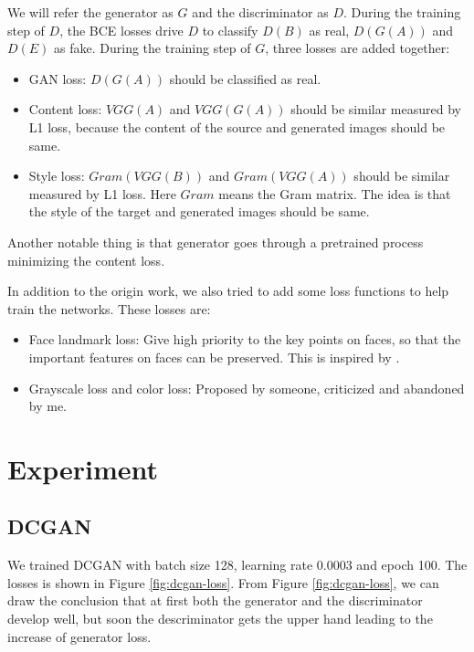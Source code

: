 \documentclass[10pt,twocolumn,letterpaper]{article}
\begin{document}
We will refer the generator as $G$ and the discriminator as $D$. During the
training step of $D$, the BCE losses drive $D$ to classify $D(B)$ as real,
$D(G(A))$ and $D(E)$ as fake. During the training step of $G$, three losses are
added together:
\begin{itemize}[noitemsep, topsep=0pt]
   \item GAN loss: $D(G(A))$ should be classified as real.
   \item Content loss: $VGG(A)$ and $VGG(G(A))$ should be similar measured by L1
   loss, because the content of the source and generated images should be same.
   \item Style loss: $Gram(VGG(B))$ and $Gram(VGG(A))$ should be similar
   measured by L1 loss. Here $Gram$ means the Gram matrix. The idea is that the
   style of the target and generated images should be same.
\end{itemize}
Another notable thing is that generator goes through a pretrained process
minimizing the content loss.

In addition to the origin work, we also tried to add some loss functions to help
train the networks. These losses are:
\begin{itemize}[noitemsep, topsep=0pt]
   \item Face landmark loss: Give high priority to the key points on faces, so
   that the important features on faces can be preserved.
   This is inspired by \cite{wu2019landmark}.
   \item Grayscale loss and color loss: Proposed by someone, criticized and
   abandoned by me.
\end{itemize}

\section{Experiment}

\subsection{DCGAN}

We trained DCGAN with batch size 128, learning rate 0.0003 and epoch 100. The
losses is shown in Figure \ref{fig:dcgan-loss}. From Figure
\ref{fig:dcgan-loss}, we can draw the conclusion that at first both the
generator and the discriminator develop well, but soon the descriminator gets
the upper hand leading to the increase of generator loss.
\end{document}
